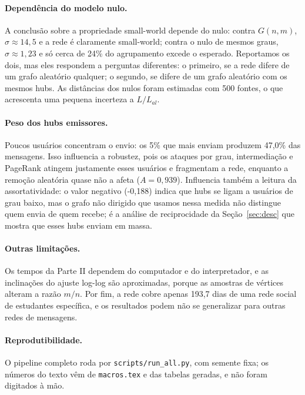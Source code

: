\documentclass[sigconf]{webmedia}
\newcommand{\nDias}{193{,}7}
\newcommand{\assortatividade}{-0{,}188}
\newcommand{\sigmaER}{14{,}5}
\newcommand{\sigmaGrau}{1{,}23}
\newcommand{\AAleatorio}{0{,}939}
\newcommand{\topCincoMsgs}{47{,}0\%}
\begin{document}
\paragraph{Dependência do modelo nulo.} A conclusão sobre a propriedade small-world depende do nulo: contra $G(n,m)$, $\sigma\approx\sigmaER$ e a rede é claramente small-world; contra o nulo de mesmos graus, $\sigma\approx\sigmaGrau$ e só cerca de 24\% do agrupamento excede o esperado. Reportamos os dois, mas eles respondem a perguntas diferentes: o primeiro, se a rede difere de um grafo aleatório qualquer; o segundo, se difere de um grafo aleatório com os mesmos hubs. As distâncias dos nulos foram estimadas com 500 fontes, o que acrescenta uma pequena incerteza a $L/L_{al}$.

\paragraph{Peso dos hubs emissores.} Poucos usuários concentram o envio: os 5\% que mais enviam produzem \topCincoMsgs{} das mensagens. Isso influencia a robustez, pois os ataques por grau, intermediação e PageRank atingem justamente esses usuários e fragmentam a rede, enquanto a remoção aleatória quase não a afeta ($A=\AAleatorio$). Influencia também a leitura da assortatividade: o valor negativo (\assortatividade) indica que hubs se ligam a usuários de grau baixo, mas o grafo não dirigido que usamos nessa medida não distingue quem envia de quem recebe; é a análise de reciprocidade da Seção~\ref{sec:desc} que mostra que esses hubs enviam em massa.

\paragraph{Outras limitações.} Os tempos da Parte II dependem do computador e do interpretador, e as inclinações do ajuste log-log são aproximadas, porque as amostras de vértices alteram a razão $m/n$. Por fim, a rede cobre apenas \nDias{} dias de uma rede social de estudantes específica, e os resultados podem não se generalizar para outras redes de mensagens.

\paragraph{Reprodutibilidade.} O pipeline completo roda por \texttt{scripts/run\_all.py}, com semente fixa; os números do texto vêm de \texttt{macros.tex} e das tabelas geradas, e não foram digitados à mão.
\end{document}
